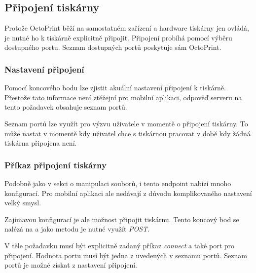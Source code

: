 \subsection{Připojení tiskárny}

Protože OctoPrint běží na samostatném zařízení a hardware tiskárny jen ovládá, je nutné ho k tiskárně explicitně připojit.
Připojení probíhá pomocí výběru dostupného portu.
Seznam dostupných portů poskytuje sám OctoPrint.

\subsubsection*{Nastavení připojení}

Pomocí koncového bodu  lze zjistit akuální nastavení připojení k tiskárně.
Přestože tato informace není ztěžejní pro mobilní aplikaci, odpověď serveru na tento požadavek obsahuje seznam portů.

Seznam portů lze využít pro výzvu uživatele v momentě o připojení tiskárny.
To může nastat v momentě kdy uživatel chce s tiskárnou pracovat v době kdy žádná tiskárna připojena není.

\subsubsection*{Příkaz připojení tiskárny}

Podobně jako v sekci o manipulaci souborů, i tento endpoint nabízí mnoho konfigurací.
Pro mobilní aplikaci ale nedávají z důvodu komplikovaného nastavení velký smysl.

Zajímavou konfigurací je ale možnost připojit tiskárnu.
Tento koncový bod se nalézá na  a jako metodu je nutné využít \textit{POST}.

V těle požadavku musí být explicitně zadaný příkaz \textit{connect} a také port pro připojení.
Hodnota portu musí být jedna z uvedených v seznamu portů.
Seznam portů je možné získat z nastavení připojení.
